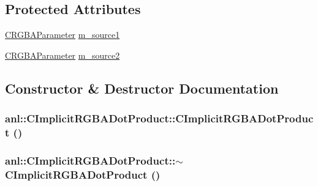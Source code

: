 \subsection*{Protected Attributes}
\begin{DoxyCompactItemize}
\item 
\hyperlink{classanl_1_1CRGBAParameter}{CRGBAParameter} \hyperlink{classanl_1_1CImplicitRGBADotProduct_a5315a1397eac353a716f9065a04cb45e}{m\_\-source1}
\item 
\hyperlink{classanl_1_1CRGBAParameter}{CRGBAParameter} \hyperlink{classanl_1_1CImplicitRGBADotProduct_aeb3cfbc609a5b41160e8905b78ae8557}{m\_\-source2}
\end{DoxyCompactItemize}


\subsection{Constructor \& Destructor Documentation}
\hypertarget{classanl_1_1CImplicitRGBADotProduct_aef30acf03ca5aeffe0e43b2ff4675cf6}{
\subsubsection[{CImplicitRGBADotProduct}]{\setlength{\rightskip}{0pt plus 5cm}anl::CImplicitRGBADotProduct::CImplicitRGBADotProduct ()}}
\label{classanl_1_1CImplicitRGBADotProduct_aef30acf03ca5aeffe0e43b2ff4675cf6}
\hypertarget{classanl_1_1CImplicitRGBADotProduct_a759e4c4c9e1e7e7f4a1b4d562d9e8c96}{
\subsubsection[{$\sim$CImplicitRGBADotProduct}]{\setlength{\rightskip}{0pt plus 5cm}anl::CImplicitRGBADotProduct::$\sim$CImplicitRGBADotProduct ()}}
\label{classanl_1_1CImplicitRGBADotProduct_a759e4c4c9e1e7e7f4a1b4d562d9e8c96}


